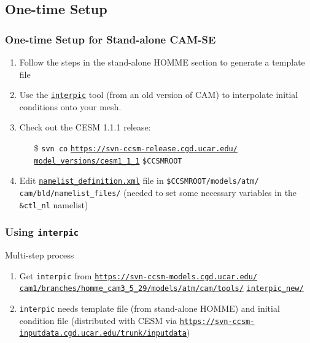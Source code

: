 \documentclass{beamer}
\newcommand{\interpic}{\hyperlink{interpic}{\texttt{interpic}}}
\newcommand{\namelist}{\hyperlink{namelist}{\texttt{namelist\_definition.xml}}}
\begin{document}
\subsection{One-time Setup}
\begin{frame}
\frametitle{One-time Setup for Stand-alone CAM-SE}
\begin{block}{}
\begin{enumerate}
\item Follow the steps in the stand-alone HOMME section to generate a template file
\item Use the \interpic{} tool (from an old version of CAM) to interpolate initial conditions onto your mesh.
\item Check out the CESM 1.1.1 release:\\
\begin{itemize}
\item[\$] \texttt{svn co}
\href{https://svn-ccsm-release.cgd.ucar.edu/model_versions/cesm1_1_1}{\texttt{https://svn-ccsm-release.cgd.ucar.edu/}}
\href{https://svn-ccsm-release.cgd.ucar.edu/model_versions/cesm1_1_1}{\texttt{model\_versions/cesm1\_1\_1}} \texttt{\$CCSMROOT}
\end{itemize}
\item Edit \namelist{} file in \texttt{\$CCSMROOT/models/atm/}
\texttt{cam/bld/namelist\_files/} (needed to set some necessary variables in the \texttt{\&ctl\_nl} namelist)
\end{enumerate}
\end{block}
\end{frame}
%
\hypertarget{interpic}{}
\begin{frame}
\frametitle{Using \texttt{interpic}}
\begin{block}{Multi-step process}
\begin{enumerate}
\item Get \texttt{interpic} from
\href{https://svn-ccsm-models.cgd.ucar.edu/cam1/branches/homme_cam3_5_29/models/atm/cam/tools/interpic_new/}{\texttt{\underline{https://svn-ccsm-models.cgd.ucar.edu/}}}
\href{https://svn-ccsm-models.cgd.ucar.edu/cam1/branches/homme_cam3_5_29/models/atm/cam/tools/interpic_new/}{\texttt{\underline{cam1/branches/homme\_cam3\_5\_29/models/atm/cam/tools/}}}
\href{https://svn-ccsm-models.cgd.ucar.edu/cam1/branches/homme_cam3_5_29/models/atm/cam/tools/interpic_new/}{\texttt{\underline{interpic\_new/}}}
\item \texttt{interpic} needs template file (from stand-alone HOMME) and initial condition file (distributed with CESM via 
\href{https://svn-ccsm-inputdata.cgd.ucar.edu/trunk/inputdata}{\texttt{\underline{https://svn-ccsm-inputdata.cgd.ucar.edu/trunk/inputdata}}})
\end{enumerate}
\end{block}
\end{frame}
\end{document}
